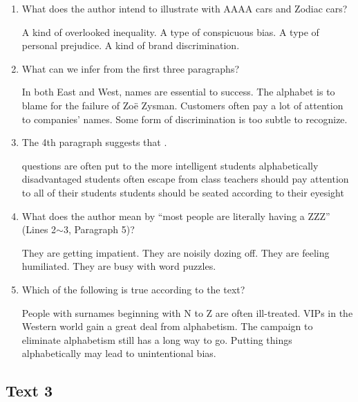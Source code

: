 \newpage
\begin{enumerate}[resume]
	\item
What does the author intend to illustrate with AAAA cars and Zodiac
cars?


\fourchoices
{A kind of overlooked inequality.}
{A type of conspicuous bias.}
{A type of personal prejudice.}
{A kind of brand discrimination.}

 
\item
 What can we infer from the first three paragraphs?

\fourchoices
{In both East and West, names are essential to success.}
{The alphabet is to blame for the failure of Zoë Zysman.}
{Customers often pay a lot of attention to companies' names.}
{Some form of discrimination is too subtle to recognize.}



\item
The 4th paragraph suggests that \lineread.

\fourchoices
{questions are often put to the more intelligent students}
{alphabetically disadvantaged students often escape from class}
{teachers should pay attention to all of their students}
{students should be seated according to their eyesight}


\item
What does the author mean by ``most people are literally having a
ZZZ'' (Lines 2$ \sim $3, Paragraph 5)?


\fourchoices
{They are getting impatient.}
{They are noisily dozing off.}
{They are feeling humiliated.}
{They are busy with word puzzles.}


\item
Which of the following is true according to the text?

\fourchoices
{People with surnames beginning with N to Z are often ill-treated.}
{VIPs in the Western world gain a great deal from alphabetism.}
{The campaign to eliminate alphabetism still has a long way to go.}
{Putting things alphabetically may lead to unintentional bias.}

\end{enumerate}


\newpage
\subsection{Text 3}



